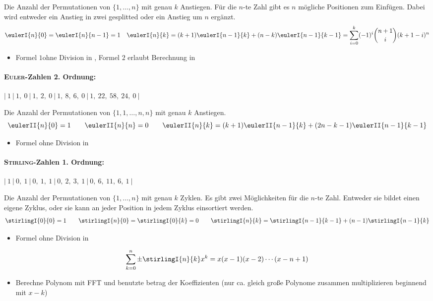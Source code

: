 Die Anzahl der Permutationen von $\{1, \ldots, n\}$ mit genau $k$ Anstiegen.
Für die $n$-te Zahl gibt es $n$ mögliche Positionen zum Einfügen.
Dabei wird entweder ein Anstieg in zwei gesplitted oder ein Anstieg um $n$ ergänzt.
\[\eulerI{n}{0} = \eulerI{n}{n-1} = 1 \quad
\eulerI{n}{k} = (k+1) \eulerI{n-1}{k} + (n-k) \eulerI{n-1}{k-1}=
\sum_{i=0}^{k} (-1)^i\binom{n+1}{i}(k+1-i)^n\]
\begin{itemize}
	\item Formel $1$ohne Division in , Formel $2$ erlaubt Berechnung in 
\end{itemize}

\paragraph{\textsc{Euler}-Zahlen 2. Ordnung:}
$|~1~|~1,~0~|~1,~2,~0~|~1,~8,~6,~0~|~1,~22,~58,~24,~0~|$

Die Anzahl der Permutationen von $\{1,1, \ldots, n,n\}$ mit genau $k$ Anstiegen.
\[\eulerII{n}{0} = 1 \qquad\eulerII{n}{n} = 0 \qquad\eulerII{n}{k} = (k+1) \eulerII{n-1}{k} + (2n-k-1) \eulerII{n-1}{k-1}\]
\begin{itemize}
	\item Formel ohne Division in 
\end{itemize}

\paragraph{\textsc{Stirling}-Zahlen 1. Ordnung:}
$|~1~|~0,~1~|~0,~1,~1~|~0,~2,~3,~1~|~0,~6,~11,~6,~1~|$

Die Anzahl der Permutationen von $\{1, \ldots, n\}$ mit genau $k$ Zyklen.
Es gibt zwei Möglichkeiten für die $n$-te Zahl. Entweder sie bildet einen eigene Zyklus, oder sie kann an jeder Position in jedem Zyklus einsortiert werden.
\[\stirlingI{0}{0} = 1 \qquad
\stirlingI{n}{0} = \stirlingI{0}{k} = 0 \qquad
\stirlingI{n}{k} = \stirlingI{n-1}{k-1} + (n-1) \stirlingI{n-1}{k}\]
\begin{itemize}
	\item Formel ohne Division in 
\end{itemize}
\[\sum_{k=0}^{n}\pm\stirlingI{n}{k}x^k=x(x-1)(x-2)\cdots(x-n+1)\]
\begin{itemize}
	\item Berechne Polynom mit FFT und benutzte betrag der Koeffizienten  (nur ca. gleich große Polynome zusammen multiplizieren beginnend mit $x-k$)
\end{itemize}

